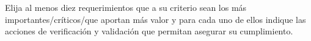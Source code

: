 %
%
%
%
%






Elija al menos diez requerimientos que a su criterio sean los más importantes/críticos/que aportan más valor y para cada uno de ellos indique las acciones de verificación y validación que permitan asegurar su cumplimiento.


